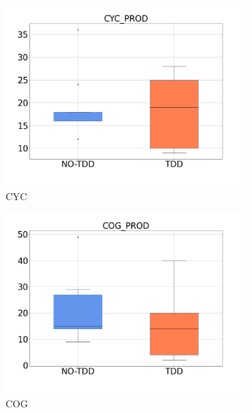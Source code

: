 \begin{figure}[H]
    \medskip
    \begin{subfigure}{0.33\textwidth}
        \includegraphics[width=\linewidth]{figures/box_plots/task1_2/CYC.png}
        \caption{CYC}
        \label{bp_task1_2_cyc}
    \end{subfigure}\hfil
    \begin{subfigure}{0.33\textwidth}
        \includegraphics[width=\linewidth]{figures/box_plots/task1_2/COG.png}
        \caption{COG}
        \label{bp_task1_2_cog}
    \end{subfigure}\hfil
    \begin{subfigure}{0.33\textwidth}

\end{subfigure}
\end{figure}
